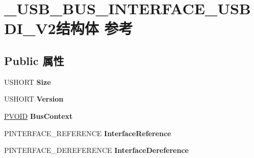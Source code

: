 \hypertarget{struct___u_s_b___b_u_s___i_n_t_e_r_f_a_c_e___u_s_b_d_i___v2}{}\section{\+\_\+\+U\+S\+B\+\_\+\+B\+U\+S\+\_\+\+I\+N\+T\+E\+R\+F\+A\+C\+E\+\_\+\+U\+S\+B\+D\+I\+\_\+\+V2结构体 参考}
\label{struct___u_s_b___b_u_s___i_n_t_e_r_f_a_c_e___u_s_b_d_i___v2}
\subsection*{Public 属性}
\begin{DoxyCompactItemize}
\item 
\mbox{\label{struct___u_s_b___b_u_s___i_n_t_e_r_f_a_c_e___u_s_b_d_i___v2_a456d0309a0a4470269d5f0ecd124634c}} 
U\+S\+H\+O\+RT {\bfseries Size}
\item 
\mbox{\label{struct___u_s_b___b_u_s___i_n_t_e_r_f_a_c_e___u_s_b_d_i___v2_ab56d5644434e1e32b45ddcbd990ed236}} 
U\+S\+H\+O\+RT {\bfseries Version}
\item 
\mbox{\label{struct___u_s_b___b_u_s___i_n_t_e_r_f_a_c_e___u_s_b_d_i___v2_aeadca2b3762f57821e81c645e7c2e469}} 
\hyperlink{interfacevoid}{P\+V\+O\+ID} {\bfseries Bus\+Context}
\item 
\mbox{\label{struct___u_s_b___b_u_s___i_n_t_e_r_f_a_c_e___u_s_b_d_i___v2_a137ee9d9ae03b616754b0da296750402}} 
P\+I\+N\+T\+E\+R\+F\+A\+C\+E\+\_\+\+R\+E\+F\+E\+R\+E\+N\+CE {\bfseries Interface\+Reference}
\item 
\mbox{\label{struct___u_s_b___b_u_s___i_n_t_e_r_f_a_c_e___u_s_b_d_i___v2_ae01ac38cf007ff544da697a38521c514}} 
P\+I\+N\+T\+E\+R\+F\+A\+C\+E\+\_\+\+D\+E\+R\+E\+F\+E\+R\+E\+N\+CE {\bfseries Interface\+Dereference}
\item 
\mbox{\label{struct___u_s_b___b_u_s___i_n_t_e_r_f_a_c_e___u_s_b_d_i___v2_a81fda480d09875d79f2969df6f3ed7a2}} 

\end{DoxyCompactItemize}
